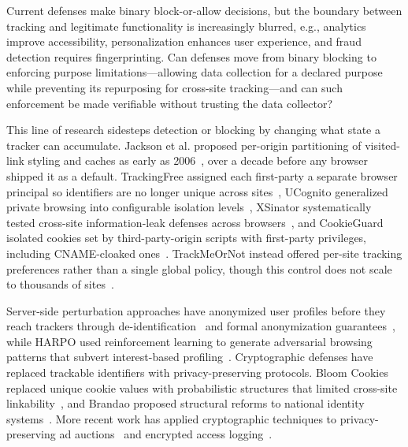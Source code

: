 \begin{opbox}
Current defenses make binary block-or-allow decisions, but the boundary between tracking and legitimate functionality is increasingly blurred, e.g., analytics improve accessibility, personalization enhances user experience, and fraud detection requires fingerprinting. Can defenses move from binary blocking to enforcing purpose limitations---allowing data collection for a declared purpose while preventing its repurposing for cross-site tracking---and can such enforcement be made verifiable without trusting the data collector?
\end{opbox}



%
This line of research sidesteps detection or blocking by changing what state a tracker can accumulate.
%
Jackson et al. proposed per-origin partitioning of visited-link styling and caches as early as 2006~\cite{jacksonProtectingBrowserState2006}, over a decade before any browser shipped it as a default.
%
TrackingFree assigned each first-party a separate browser principal so identifiers are no longer unique across sites~\cite{panNotKnowWhat2015}, UCognito generalized private browsing into configurable isolation levels~\cite{xuUCognitoPrivateBrowsing2015}, XSinator systematically tested cross-site information-leak defenses across browsers~\cite{knittelXSinatorcomFormalModel2021}, and CookieGuard isolated cookies set by third-party-origin scripts with first-party privileges, including CNAME-cloaked ones~\cite{nikkhahbahramiCookieGuardCharacterizingIsolating2025}.
%
TrackMeOrNot instead offered per-site tracking preferences rather than a single global policy, though this control does not scale to thousands of sites~\cite{mengTrackMeOrNotEnablingFlexible2016,nisenoffDefiningBrokenUser2023}.

Server-side perturbation approaches have anonymized user profiles before they reach trackers through de-identification~\cite{zhengWebUserDeidentification2008} and formal anonymization guarantees~\cite{zhuAnonymizingUserProfiles2010}, while HARPO used reinforcement learning to generate adversarial browsing patterns that subvert interest-based profiling~\cite{zhangHARPOLearningSubvert2022}.
%
Cryptographic defenses have replaced trackable identifiers with privacy-preserving protocols.
%
Bloom Cookies replaced unique cookie values with probabilistic structures that limited cross-site linkability~\cite{morBloomCookiesWeb2015}, and Brandao proposed structural reforms to national identity systems~\cite{brandaoMendingTwoNationScale2015}.
%
More recent work has applied cryptographic techniques to privacy-preserving ad auctions~\cite{zhongIbexPrivacypreservingAd2022} and encrypted access logging~\cite{ortegaperezEncryptedAccessLogging2025}.


